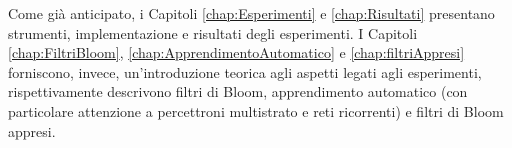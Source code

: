 \documentclass[../../main.tex]{subfiles}
\begin{document}
    Come già anticipato, i Capitoli \ref{chap:Esperimenti} e \ref{chap:Risultati} presentano strumenti, implementazione e risultati degli esperimenti. I Capitoli \ref{chap:FiltriBloom}, \ref{chap:ApprendimentoAutomatico} e \ref{chap:filtriAppresi} forniscono, invece, un'introduzione teorica agli aspetti legati agli esperimenti, rispettivamente descrivono filtri di Bloom, apprendimento automatico (con particolare attenzione a percettroni multistrato e reti ricorrenti) e filtri di Bloom appresi.
\end{document}
